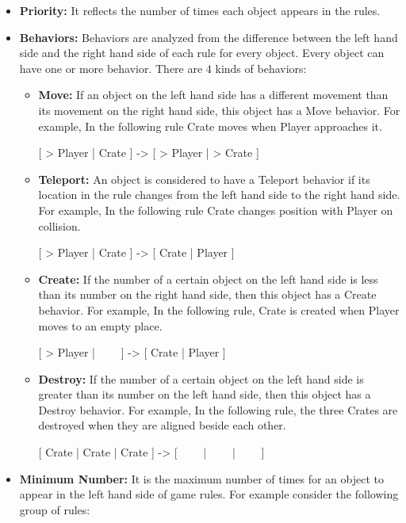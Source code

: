 \begin{itemize}
	\item \textbf{Priority:} It reflects the number of times each object appears in the rules.
	\item \textbf{Behaviors:} Behaviors are analyzed from the difference between the left hand side and the right hand side of each rule for every object. Every object can have one or more behavior. There are 4 kinds of behaviors:
		\begin{itemize} \itemsep0pt \parskip0pt 
			\item \textbf{Move:} If an object on the left hand side has a different movement than its movement on the right hand side, this object has a Move behavior. For example, In the following rule Crate moves when Player approaches it.
			\begin{center}
				[ > Player | Crate ] -> [ > Player | > Crate ]
			\end{center}
			\item \textbf{Teleport:} An object is considered to have a Teleport behavior if its location in the rule changes from the left hand side to the right hand side. For example, In the following rule Crate changes position with Player on collision.
			\begin{center}
				[ > Player | Crate ] -> [ Crate | Player ]
			\end{center}
			\item \textbf{Create:} If the number of a certain object on the left hand side is less than its number on the right hand side, then this object has a Create behavior. For example, In the following rule, Crate is created when Player moves to an empty place.
			\begin{center}
				[ > Player | \ \ \ \ ] -> [ Crate | Player ]
			\end{center}
			\item \textbf{Destroy:} If the number of a certain object on the left hand side is greater than its number on the left hand side, then this object has a Destroy behavior. For example, In the following rule, the three Crates are destroyed when they are aligned beside each other.
			\begin{center}
				[ Crate | Crate | Crate ] -> [ \ \ \ \ | \ \ \ \ | \ \ \ \ ]
			\end{center}
		\end{itemize}
	\item \textbf{Minimum Number:} It is the maximum number of times for an object to appear in the left hand side of game rules. For example consider the following group of rules:

\end{itemize}
